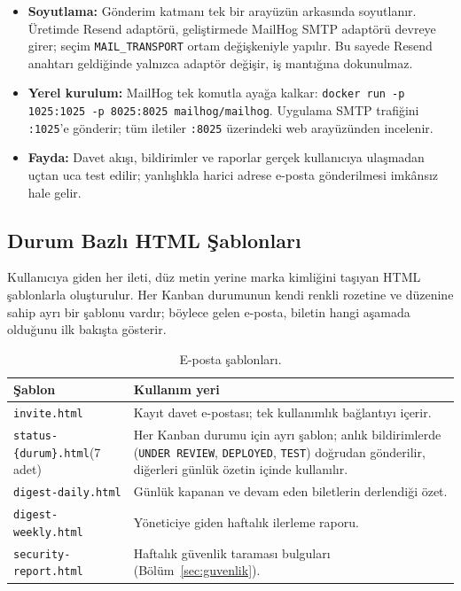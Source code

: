 \documentclass[11pt,a4paper]{article}
\begin{document}
\begin{itemize}
  \item \textbf{Soyutlama:} Gönderim katmanı tek bir arayüzün arkasında
  soyutlanır. Üretimde Resend adaptörü, geliştirmede MailHog SMTP
  adaptörü devreye girer; seçim \texttt{MAIL\_TRANSPORT} ortam
  değişkeniyle yapılır. Bu sayede Resend anahtarı geldiğinde yalnızca
  adaptör değişir, iş mantığına dokunulmaz.
  \item \textbf{Yerel kurulum:} MailHog tek komutla ayağa kalkar:
  \texttt{docker run -p 1025:1025 -p 8025:8025 mailhog/mailhog}.
  Uygulama SMTP trafiğini \texttt{:1025}'e gönderir; tüm iletiler
  \texttt{:8025} üzerindeki web arayüzünden incelenir.
  \item \textbf{Fayda:} Davet akışı, bildirimler ve raporlar gerçek
  kullanıcıya ulaşmadan uçtan uca test edilir; yanlışlıkla harici adrese
  e-posta gönderilmesi imkânsız hale gelir.
\end{itemize}

\subsection{Durum Bazlı HTML Şablonları}

Kullanıcıya giden her ileti, düz metin yerine marka kimliğini taşıyan
HTML şablonlarla oluşturulur. Her Kanban durumunun kendi renkli rozetine
ve düzenine sahip ayrı bir şablonu vardır; böylece gelen e-posta,
biletin hangi aşamada olduğunu ilk bakışta gösterir.

\begin{table}[H]
\centering
\small
\begin{tabularx}{\textwidth}{p{4.6cm}X}
\toprule
\textbf{Şablon} & \textbf{Kullanım yeri}\\
\midrule
\texttt{invite.html} & Kayıt davet e-postası; tek kullanımlık bağlantıyı içerir.\\
\addlinespace
\texttt{status-\{durum\}.html}\newline (7 adet) & Her Kanban durumu için ayrı şablon; anlık bildirimlerde (\texttt{UNDER REVIEW}, \texttt{DEPLOYED}, \texttt{TEST}) doğrudan gönderilir, diğerleri günlük özetin içinde kullanılır.\\
\addlinespace
\texttt{digest-daily.html} & Günlük kapanan ve devam eden biletlerin derlendiği özet.\\
\addlinespace
\texttt{digest-weekly.html} & Yöneticiye giden haftalık ilerleme raporu.\\
\addlinespace
\texttt{security-report.html} & Haftalık güvenlik taraması bulguları (Bölüm~\ref{sec:guvenlik}).\\
\bottomrule
\end{tabularx}
\caption{E-posta şablonları.}
\label{tab:sablonlar}
\end{table}
\end{document}
